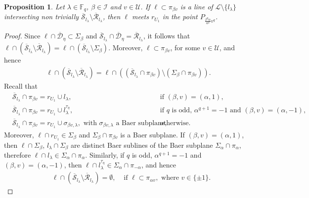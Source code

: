 \documentclass[11pt]{article}
\newtheorem{prop}[theorem]{Proposition}
\theoremstyle{definition}
\numberwithin{equation}{section}
\def\cI{\mathcal I}
\def\cL{\mathcal L}
\def\cD{\mathcal D}
\def\cU{\mathcal U}
\def\cR{\mathcal R}
\def\cS{\mathcal S}
\def\F{{\mathbb F}}
\begin{document}
\begin{prop}\label{prop2}
Let $\lambda \in \F_q$, $\beta \in \cI$ and $v \in \cU$. If $\ell \subset \pi_{\beta v}$ is a line of $\cL \setminus \{l_\lambda\}$ intersecting non trivially $\overline{\cS}_{l_\lambda} \setminus \overline{\cR}_{l_\lambda}$, then $\ell$ meets $r_{U_1}$ in the point $P_{\frac{\beta^q \alpha}{\alpha^q} v^q}$. 
\end{prop}
\begin{proof}
Since $\ell \cap \overline{\cD}_{\eta} \subset \Sigma_{\beta}$ and $\overline{\cS}_{l_\lambda} \cap \overline{\cD}_{\eta} = \overline{\cR}_{l_\lambda}$, it follows that $\ell \cap \left( \overline{\cS}_{l_\lambda} \setminus \overline{\cR}_{l_\lambda} \right) = \ell \cap \left( \overline{\cS}_{l_\lambda} \setminus \Sigma_{\beta} \right)$. Moreover, $\ell \subset \pi_{\beta v}$, for some $v \in \cU$, and hence 
\begin{align*}
\ell \cap \left( \overline{\cS}_{l_\lambda} \setminus \overline{\cR}_{l_\lambda} \right) = \ell \cap \left( \left( \overline{\cS}_{l_\lambda}  \cap \pi_{\beta v} \right) \setminus \left( \Sigma_{\beta} \cap \pi_{\beta v} \right) \right).
\end{align*} 
Recall that 
\begin{align*}
& \overline{\cS}_{l_\lambda}  \cap \pi_{\beta v} = r_{U_1} \cup l_\lambda, & & \mbox{ if } (\beta, v) = (\alpha, 1), \\
& \overline{\cS}_{l_\lambda}  \cap \pi_{\beta v} = r_{U_1} \cup l_\lambda^{\tau_{\eta}}, & & \mbox{ if } q \mbox{ is odd, } \alpha^{q+1} = -1 \mbox{ and }(\beta,v)=(\alpha,-1), \\
& \overline{\cS}_{l_\lambda}  \cap \pi_{\beta v} = r_{U_1} \cup \sigma_{\beta v, \lambda}, \mbox{ with } \sigma_{\beta v, \lambda} \mbox{ a Baer subplane, } & & \mbox{ otherwise. } %
\end{align*}
Moreover, $\ell \cap r_{U_1} \in \Sigma_{\beta}$ and $\Sigma_{\beta} \cap \pi_{\beta v}$ is a Baer subplane. If $(\beta, v) = (\alpha, 1)$, then $\ell \cap \Sigma_{\beta}$, $l_\lambda \cap \Sigma_{\beta}$ are distinct Baer sublines of the Baer subplane $\Sigma_{\alpha} \cap \pi_{\alpha}$, therefore $\ell \cap l_\lambda \in \Sigma_{\alpha} \cap \pi_{\alpha}$. Similarly, if $q$ is odd, $\alpha^{q+1} = -1$ and $(\beta, v) = (\alpha, -1)$, then $\ell \cap l_\lambda^{\tau_{\eta}} \in \Sigma_{\alpha} \cap \pi_{-\alpha}$, and hence 
\begin{align*}
& \ell \cap \left( \overline{\cS}_{l_\lambda} \setminus \overline{\cR}_{l_\lambda} \right) = \emptyset, & \mbox{ if } \ell \subset \pi_{\alpha v}, \mbox{ where } v \in \{\pm 1\}.

\end{align*}
\end{proof}
\end{document}

